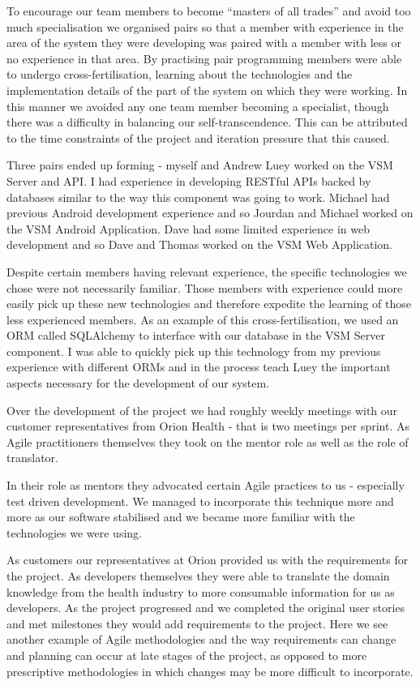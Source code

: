 \documentclass[conference]{IEEEtran}
\begin{document}
To encourage our team members to become ``masters of all trades'' and avoid too
much specialisation we organised pairs so that a member with experience in the
area of the system they were developing was paired with a member with less or no
experience in that area. By practising pair programming members were able to
undergo cross-fertilisation, learning about the technologies and the
implementation details of the part of the system on which they were working. In
this manner we avoided any one team member becoming a specialist, though there
was a difficulty in balancing our self-transcendence. This can be attributed to
the time constraints of the project and iteration pressure that this caused.

Three pairs ended up forming - myself and Andrew Luey worked on the VSM Server
and API. I had experience in developing RESTful APIs backed by databases similar
to the way this component was going to work. Michael had previous Android
development experience and so Jourdan and Michael worked on the VSM Android
Application. Dave had some limited experience in web development and so Dave and
Thomas worked on the VSM Web Application.

Despite certain members having relevant experience, the specific technologies we
chose were not necessarily familiar. Those members with experience could more
easily pick up these new technologies and therefore expedite the learning of
those less experienced members. As an example of this cross-fertilisation, we
used an ORM called SQLAlchemy to interface with our database in the VSM Server
component. I was able to quickly pick up this technology from my previous
experience with different ORMs and in the process teach Luey the important
aspects necessary for the development of our system.

Over the development of the project we had roughly weekly meetings with our
customer representatives from Orion Health - that is two meetings per sprint. As
Agile practitioners themselves they took on the mentor role as well as the role
of translator.

In their role as mentors they advocated certain Agile practices to us -
especially test driven development. We managed to incorporate this technique
more and more as our software stabilised and we became more familiar with the
technologies we were using.

As customers our representatives at Orion provided us with the requirements for
the project. As developers themselves they were able to translate the domain
knowledge from the health industry to more consumable information for us as
developers. As the project progressed and we completed the original user stories
and met milestones they would add requirements to the project. Here we see
another example of Agile methodologies and the way requirements can change and
planning can occur at late stages of the project, as opposed to more
prescriptive methodologies in which changes may be more difficult to
incorporate.
\end{document}
